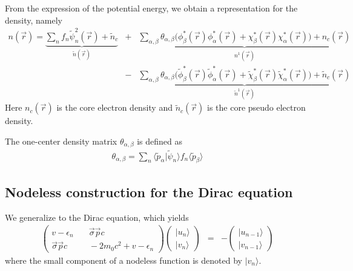\documentclass[11pt,a4paper]{report}
\begin{document}
\begin{itemize}
From the expression of the potential energy, we obtain a
representation for the density, namely
\begin{eqnarray}
n(\vec{r})=
\underbrace{
\sum_n f_n \tilde{\psi}_n^2(\vec{r})+\tilde{n}_c}_{\tilde{n}(\vec{r})}
&+&\underbrace{
\sum_{\alpha,\beta}\theta_{\alpha,\beta}
\biggl(\phi^*_\beta(\vec{r})\phi^*_\alpha(\vec{r})
+\chi^*_\beta(\vec{r})\chi^*_\alpha(\vec{r})\biggr)
+n_c(\vec{r})}_{n^1(\vec{r})}
\nonumber\\
&-&\underbrace{
\sum_{\alpha,\beta}\theta_{\alpha,\beta}
\biggl(\tilde{\phi}^*_\beta(\vec{r})\tilde{\phi}^*_\alpha(\vec{r})
+\tilde{\chi}^*_\beta(\vec{r})\tilde{\chi}^*_\alpha(\vec{r})
\biggr)+\tilde{n}_c(\vec{r})}_{\tilde{n}^1(\vec{r})}
\end{eqnarray}
Here $n_c(\vec{r})$ is the core electron density and
$\tilde{n}_c(\vec{r})$ is the core pseudo electron density.

The one-center density matrix $\theta_{\alpha,\beta}$ is defined as
\begin{eqnarray}
\theta_{\alpha,\beta}=\sum_n\langle\tilde{p}_\alpha|\tilde{\psi}_n\rangle f_n
\langle\tilde{p}_\beta\rangle
\end{eqnarray}
\end{itemize}


\subsection{Nodeless construction for the Dirac equation}
We generalize  to the Dirac equation, which yields
\begin{eqnarray}
\left(\begin{array}{cc}
v-\epsilon_n &\quad \vec{\sigma}\vec{p}c\\
\vec{\sigma}\vec{p}c &\quad -2m_0c^2+v-\epsilon_n\end{array}\right)
\left(\begin{array}{c}|u_n\rangle\\|v_n\rangle\end{array}\right)
&=&-\left(\begin{array}{c}|u_{n-1}\rangle\\|v_{n-1}\rangle\end{array}\right)
\end{eqnarray}
where the small component of a nodeless function is denoted by $|v_n\rangle$.
\end{document}
